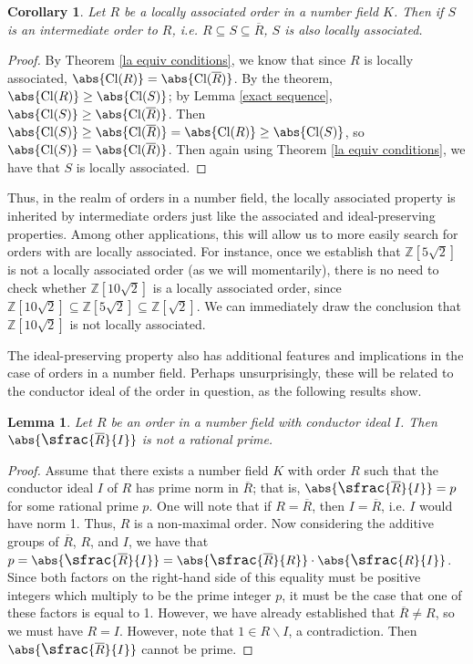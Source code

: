 \documentclass[12pt]{amsart}
\newtheorem{lemma}[theorem]{Lemma}
\newtheorem{corollary}[theorem]{Corollary}
\theoremstyle{definition}
\newcommand{\bZ}{\mathbb Z}
\newcommand{\Rbar}{\overline{R}}
\newcommand{\Cl}{\textup{Cl}}
\newcommand{\quot}[2]{\large\sfrac{#1}{#2}\normalsize}
\begin{document}
	\begin{corollary}
		\label{la in towers}
		Let $R$ be a locally associated order in a number field $K$. Then if $S$ is an intermediate order to $R$, i.e. $R\subseteq S\subseteq \Rbar$, $S$ is also locally associated.
	\end{corollary}
	
	\begin{proof}
		By Theorem \ref{la equiv conditions}, we know that since $R$ is locally associated, $\abs{\Cl(R)}=\abs{\Cl(\Rbar)}$. By the theorem, $\abs{\Cl(R)}\geq \abs{\Cl(S)}$; by Lemma \ref{exact sequence}, $\abs{\Cl(S)}\geq \abs{\Cl(\Rbar)}$. Then $\abs{\Cl(S)}\geq \abs{\Cl(\Rbar)}=\abs{\Cl(R)}\geq\abs{\Cl(S)}$, so $\abs{\Cl(S)}=\abs{\Cl(\Rbar)}$. Then again using Theorem \ref{la equiv conditions}, we have that $S$ is locally associated.
	\end{proof}
	
	Thus, in the realm of orders in a number field, the locally associated property is inherited by intermediate orders just like the associated and ideal-preserving properties. Among other applications, this will allow us to more easily search for orders with are locally associated. For instance, once we establish that $\bZ[5\sqrt{2}]$ is not a locally associated order (as we will momentarily), there is no need to check whether $\bZ[10\sqrt{2}]$ is a locally associated order, since $\bZ[10\sqrt{2}]\subseteq \bZ[5\sqrt{2}]\subseteq \bZ[\sqrt{2}]$. We can immediately draw the conclusion that $\bZ[10\sqrt{2}]$ is not locally associated.
	
	The ideal-preserving property also has additional features and implications in the case of orders in a number field. Perhaps unsurprisingly, these will be related to the conductor ideal of the order in question, as the following results show.
	
	\begin{lemma}
		Let $R$ be an order in a number field with conductor ideal $I$. Then $\abs{\quot{\Rbar}{I}}$ is not a rational prime.
	\end{lemma}
	
	\begin{proof}
		Assume that there exists a number field $K$ with order $R$ such that the conductor ideal $I$ of $R$ has prime norm in $\Rbar$; that is, $\abs{\quot{\Rbar}{I}}=p$ for some rational prime $p$. One will note that if $R=\Rbar$, then $I=\Rbar$, i.e. $I$ would have norm 1. Thus, $R$ is a non-maximal order. Now considering the additive groups of $\Rbar$, $R$, and $I$, we have that $p=\abs{\quot{\Rbar}{I}}=\abs{\quot{\Rbar}{R}}\cdot\abs{\quot{R}{I}}$. Since both factors on the right-hand side of this equality must be positive integers which multiply to be the prime integer $p$, it must be the case that one of these factors is equal to 1. However, we have already established that $\Rbar\neq R$, so we must have $R=I$. However, note that $1\in R\backslash I$, a contradiction. Then $\abs{\quot{\Rbar}{I}}$ cannot be prime.
	\end{proof}
	
\end{document}
